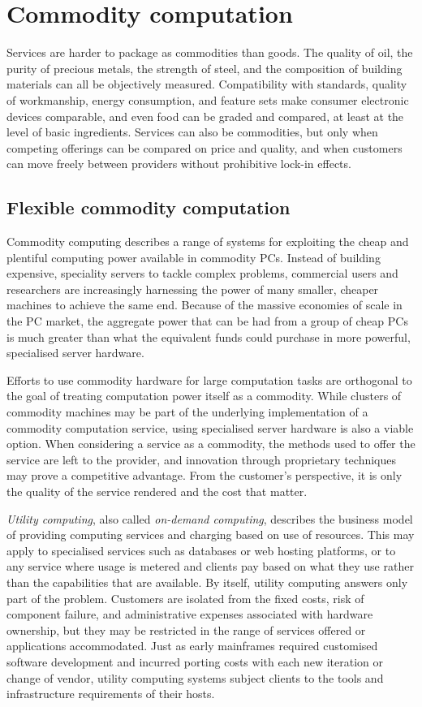 \section{Commodity computation}

Services are harder to package as commodities than goods. The quality of oil, the purity of precious metals, the strength of steel, and the composition of building materials can all be objectively measured. Compatibility with standards, quality of workmanship, energy consumption, and feature sets make consumer electronic devices comparable, and even food can be graded and compared, at least at the level of basic ingredients. Services can also be commodities, but only when competing offerings can be compared on price and quality, and when customers can move freely between providers without prohibitive lock-in effects.

\subsection{Flexible commodity computation}

Commodity computing describes a range of systems for exploiting the cheap and plentiful computing power available in commodity PCs. Instead of building expensive, speciality servers to tackle complex problems, commercial users and researchers are increasingly harnessing the power of many smaller, cheaper machines to achieve the same end. Because of the massive economies of scale in the PC market, the aggregate power that can be had from a group of cheap PCs is much greater than what the equivalent funds could purchase in more powerful, specialised server hardware.

Efforts to use commodity hardware for large computation tasks are orthogonal to the goal of treating computation power itself as a commodity. While clusters of commodity machines may be part of the underlying implementation of a commodity computation service, using specialised server hardware is also a viable option. When considering a service as a commodity, the methods used to offer the service are left to the provider, and innovation through proprietary techniques may prove a competitive advantage. From the customer's perspective, it is only the quality of the service rendered and the cost that matter.

\emph{Utility computing}, also called \emph{on-demand computing}, describes the business model of providing computing services and charging based on use of resources. This may apply to specialised services such as databases or web hosting platforms, or to any service where usage is metered and clients pay based on what they use rather than the capabilities that are available. By itself, utility computing answers only part of the problem. Customers are isolated from the fixed costs, risk of component failure, and administrative expenses associated with hardware ownership, but they may be restricted in the range of services offered or applications accommodated. Just as early mainframes required customised software development and incurred porting costs with each new iteration or change of vendor, utility computing systems subject clients to the tools and infrastructure requirements of their hosts.

